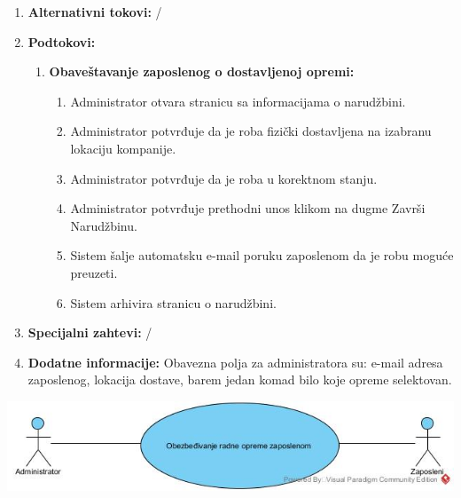 \documentclass[a4paper]{article}
\begin{document}
\begin{enumerate}
\begin{enumerate}
        \end{enumerate}
    \item \textbf{Alternativni tokovi:} /
    \item \textbf{Podtokovi:}
        \begin{enumerate}
            \item \textbf{Obaveštavanje zaposlenog o dostavljenoj opremi:}
                \begin{enumerate}
                    \item Administrator otvara stranicu sa informacijama o narudžbini.
                    \item Administrator potvrđuje da je roba fizički dostavljena na izabranu lokaciju kompanije.
                    \item Administrator potvrđuje da je roba u korektnom stanju.
                    \item Administrator potvrđuje prethodni unos klikom na dugme Završi Narudžbinu.
                    \item Sistem šalje automatsku e-mail poruku zaposlenom da je robu moguće preuzeti.
                    \item Sistem arhivira stranicu o narudžbini.
                \end{enumerate}
        \end{enumerate}
    \item \textbf{Specijalni zahtevi:} /
    \item \textbf{Dodatne informacije:} Obavezna polja za administratora su: e-mail adresa zaposlenog, lokacija dostave, barem jedan komad bilo koje opreme selektovan.
\end{enumerate}

\includegraphics[scale=0.5]{UML/SlucajUpotrebe_RadnaOprema.jpg}
\end{document}
